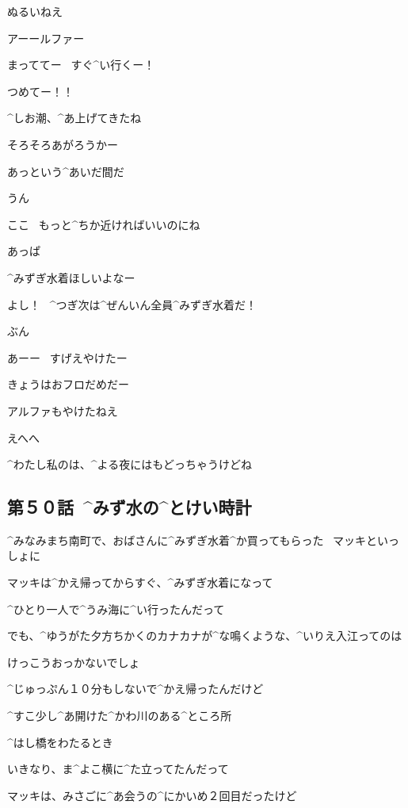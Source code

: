 \page
\Makki ぬるいねえ

\Takahiro アーールファー

\Alpha まっててー
\ すぐ^{い}{行}くー！

\page[84]
\Takahiro つめてー！！

\Alpha ^{しお}{潮}、^{あ}{上}げてきたね

\Alpha そろそろあがろうかー

\page
\Takahiro あっという^{あいだ}{間}だ

\Alpha うん

\Makki ここ
\ もっと^{ちか}{近}ければいいのにね

\Takahiro あっぱ

\Takahiro ^{みずぎ}{水着}ほしいよなー

\Alpha よし！
\ ^{つぎ}{次}は^{ぜんいん}{全員}^{みずぎ}{水着}だ！

\Alpha ぶん

\page
\Takahiro あーー
\ すげえやけたー

\Makki きょうはおフロだめだー

\Takahiro アルファもやけたねえ

\Alpha えへへ

\Alpha ^{わたし}{私}のは、^{よる}{夜}にはもどっちゃうけどね


\subsection{第５０話\ ^{みず}{水}の^{とけい}{時計}}

\page[90]
\Takahiro ^{みなみまち}{南町}で、おばさんに^{みずぎ}{水着}^{か}{買}ってもらった
\ マッキといっしょに

\Takahiro マッキは^{かえ}{帰}ってからすぐ、^{みずぎ}{水着}になって

\Takahiro ^{ひとり}{一人}で^{うみ}{海}に^{い}{行}ったんだって

\page
\Takahiro でも、^{ゆうがた}{夕方}ちかくのカナカナが^{な}{鳴}くような、^{いりえ}{入江}ってのは

\Takahiro けっこうおっかないでしょ

\Takahiro ^{じゅっぷん}{１０分}もしないで^{かえ}{帰}ったんだけど

\Takahiro ^{すこ}{少}し^{あ}{開}けた^{かわ}{川}のある^{ところ}{所}

\Takahiro ^{はし}{橋}をわたるとき

\page
\Takahiro いきなり、ま^{よこ}{横}に^{た}{立}ってたんだって

\Takahiro マッキは、みさごに^{あ}{会}うの^{にかいめ}{２回目}だったけど

